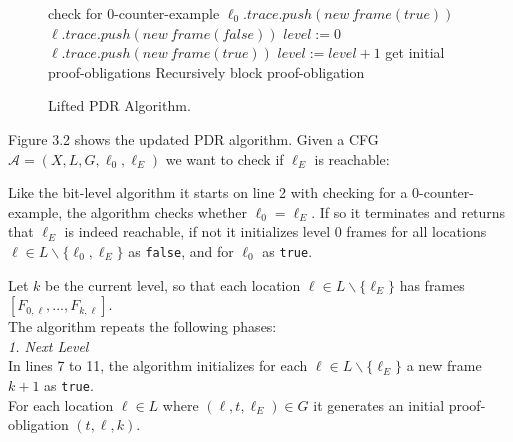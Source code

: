 \documentclass[11pt, a4paper, BCOR=10mm, ngerman]{scrbook}
\begin{document}
\begin{figure}[H]
	\begin{algorithm}[H] 
		\begin{algorithmic}[1]
			\State check for 0-counter-example
			\State $\ell_0.trace.push(new\ frame(true))$
			\State $\ell.trace.push(new\ frame(false))$
			\EndFor
			\State $level := 0$
			\Statex
			\Loop
			\State $\ell.trace.push(new\ frame(true))$
			\EndFor
			\State $level:= level + 1$
			\State get initial proof-obligations 
			\Statex
			\State Recursively block proof-obligation
			\EndIf
			\EndWhile
			
			\Statex 
			\EndIf
			\EndFor
			\EndFor
			\EndLoop
			\EndProcedure
		\end{algorithmic}
	\end{algorithm}
	\caption{Lifted PDR Algorithm.}
\end{figure}

Figure 3.2 shows the updated PDR algorithm. Given a CFG $\mathcal{A} = (X, L, G, \ell_0, \ell_E)$ we want to check if $\ell_E$ is reachable: \par

Like the bit-level algorithm it starts on line 2 with checking for a 0-counter-example, the algorithm checks whether $\ell_0 = \ell_E$. If so it terminates and returns that $\ell_E$ is indeed reachable, if not it initializes level 0 frames for all locations $\ell \in L \backslash \{\ell_0, \ell_E\}$ as \texttt{false}, and for $\ell_0$ as \texttt{true}. \par
Let $k$ be the current level, so that each location $\ell \in L \backslash \{\ell_E\}$ has frames $[F_{0, \ell}, ..., F_{k, \ell}]$. \\
The algorithm repeats the following phases: \\

\textsl{1. Next Level} \\
In lines 7 to 11, the algorithm initializes for each $\ell \in L \backslash \{\ell_E\}$ a new frame $k + 1$ as \texttt{true}. \\
For each location $\ell \in L$ where $(\ell, t, \ell_E) \in G$ it generates an initial proof-obligation $(t, \ell, k)$. \\
\end{document}
